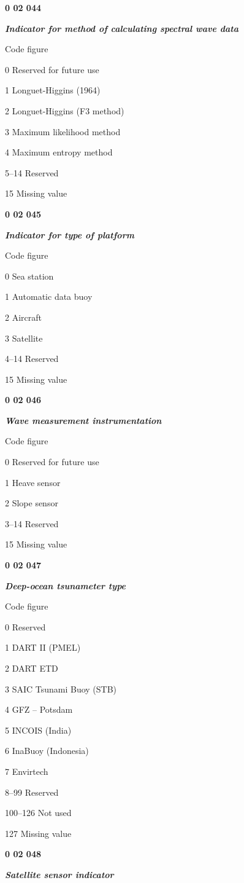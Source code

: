 \textbf{0 02 044}

\emph{\textbf{Indicator for method of calculating spectral wave data}}

Code figure

0 Reserved for future use

1 Longuet-Higgins (1964)

2 Longuet-Higgins (F3 method)

3 Maximum likelihood method

4 Maximum entropy method

5--14 Reserved

15 Missing value

\textbf{0 02 045}

\emph{\textbf{Indicator for type of platform}}

Code figure

0 Sea station

1 Automatic data buoy

2 Aircraft

3 Satellite

4--14 Reserved

15 Missing value

\textbf{0 02 046}

\emph{\textbf{Wave measurement instrumentation}}

Code figure

0 Reserved for future use

1 Heave sensor

2 Slope sensor

3--14 Reserved

15 Missing value

\textbf{0 02 047}

\emph{\textbf{Deep-ocean tsunameter type}}

Code figure

0 Reserved

1 DART II (PMEL)

2 DART ETD

3 SAIC Tsunami Buoy (STB)

4 GFZ -- Potsdam

5 INCOIS (India)

6 InaBuoy (Indonesia)

7 Envirtech

8--99 Reserved

100--126 Not used

127 Missing value

\textbf{0 02 048}

\emph{\textbf{Satellite sensor indicator}}

